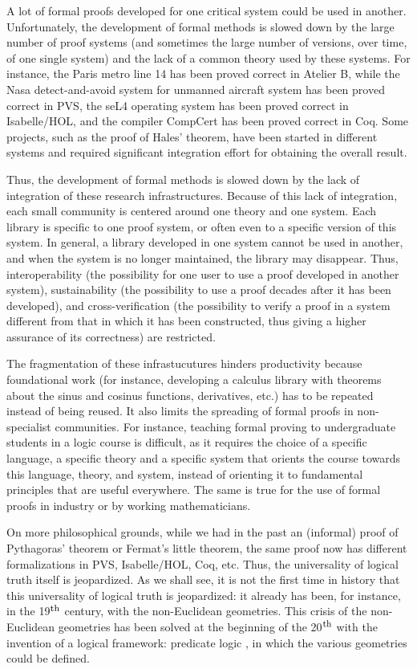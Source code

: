 A lot of formal proofs developed for one critical system could be used
in another.  Unfortunately, the development of formal methods is
slowed down by the large number of proof systems (and sometimes the
large number of versions, over time, of one single system) and the
lack of a common theory used by these systems.  For instance, the
Paris metro line 14 has been proved correct in Atelier B, while the
Nasa detect-and-avoid system for unmanned aircraft system has been
proved correct in PVS, the seL4 operating system has been proved
correct in Isabelle/HOL, and the compiler CompCert has been proved
correct in Coq.  Some projects, such as the proof of Hales' theorem,
have been started in different systems and required significant
integration effort for obtaining the overall result.

Thus, the development of formal methods is slowed down by the lack of
integration of these research infrastructures.  Because of this lack
of integration, each small community is centered around one theory and
one system. Each library is specific to one proof system, or often
even to a specific version of this system. In general, a library
developed in one system cannot be used in another, and when the system
is no longer maintained, the library may disappear.  Thus,
interoperability (the possibility for one user to use a proof
developed in another system), sustainability (the possibility to use a
proof decades after it has been developed), and cross-verification
(the possibility to verify a proof in a system different from that in
which it has been constructed, thus giving a higher assurance of its
correctness) are restricted.

The fragmentation of these infrastucutures hinders productivity
because foundational work (for instance, developing a calculus library
with theorems about the sinus and cosinus functions, derivatives,
etc.) has to be repeated instead of being reused.  It also limits the
spreading of formal proofs in non-specialist communities. For
instance, teaching formal proving to undergraduate students in a logic
course is difficult, as it requires the choice of a specific language,
a specific theory and a specific system that orients the course
towards this language, theory, and system, instead of orienting it to
fundamental principles that are useful everywhere. The same is true
for the use of formal proofs in industry or by working mathematicians.

On more philosophical grounds, while we had in the past an (informal)
proof of Pythagoras' theorem or Fermat's little theorem, the same
proof now has different formalizations in PVS, Isabelle/HOL, Coq, etc.
Thus, the universality of logical truth itself is jeopardized.  As we
shall see, it is not the first time in history that this universality
of logical truth is jeopardized: it already has been, for instance, in the
19$^{\mbox{\footnotesize th}}$ century, with the non-Euclidean
geometries. This crisis of the non-Euclidean geometries has been
solved at the beginning of the 20$^{\mbox{\footnotesize th}}$ with the
invention of a logical framework: predicate logic
\cite{HilbertAckermann}, in which the various geometries could be
defined.

